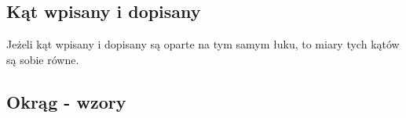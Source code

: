 \documentclass[14pt,a4paper]{extarticle}
\begin{document}
\MoveBelowBox

\subsection{Kąt wpisany i dopisany}
\hfill\break
\noindent Jeżeli kąt wpisany i dopisany są oparte na tym samym łuku, to miary tych kątów są sobie
równe.

\MoveBelowBox

\subsection{Okrąg - wzory}
\end{document}
